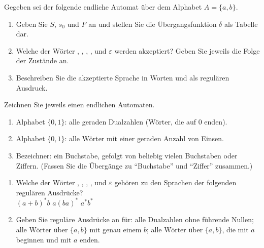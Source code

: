 \aufgaben
{}
Gegeben sei der folgende endliche Automat über dem Alphabet $A = \{a, b\}$.
\begin{center}
\end{center}
\begin{enumerate}[label=\alph*)]
\item Geben Sie $S$, $s_0$ und $F$ an und stellen Sie die Übergangsfunktion $\delta$ als Tabelle dar.
\item Welche der Wörter , , , ,  und $\varepsilon$ werden akzeptiert? Geben Sie jeweils die Folge der Zustände an.
\item Beschreiben Sie die akzeptierte Sprache in Worten und als regulären Ausdruck.
\end{enumerate}

Zeichnen Sie jeweils einen endlichen Automaten.
\begin{enumerate}[label=\alph*)]
\item Alphabet $\{0, 1\}$: alle geraden Dualzahlen (Wörter, die auf 0 enden).
\item Alphabet $\{0, 1\}$: alle Wörter mit einer geraden Anzahl von Einsen.
\item Bezeichner: ein Buchstabe, gefolgt von beliebig vielen Buchstaben oder Ziffern. (Fassen Sie die Übergänge zu \enquote{Buchstabe} und \enquote{Ziffer} zusammen.)
\end{enumerate}

\begin{enumerate}[label=\alph*)]
\item Welche der Wörter , , , ,  und $\varepsilon$ gehören zu den Sprachen der folgenden regulären Ausdrücke? \\[1mm]
$(a + b)^* b$ \qquad\qquad $a(ba)^*$ \qquad\qquad $a^* b^*$
\item Geben Sie reguläre Ausdrücke an für: alle Dualzahlen ohne führende Nullen; alle Wörter über $\{a, b\}$ mit genau einem $b$; alle Wörter über $\{a, b\}$, die mit $a$ beginnen und mit $a$ enden.
\end{enumerate}

